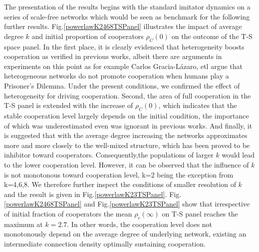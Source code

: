 \documentclass[preprint,12pt,3p]{elsarticle}
\begin{document}
    The presentation of the results begins with the standard imitator dynamics
on a series of scale-free networks which would be seen as benchmark for the following further results.
Fig.\ref{powerlawK2468TSPanel} illustrates the impact of average degree $k$
and initial proportion of cooperators $\rho_C(0)$ on the outcome of the T-S space panel.
    In the first place, it is clearly evidenced that heterogeneity boosts cooperation
as verified in previous works, albeit there are arguments in experiments on this point as for example Carlos Gracia-Lázaro, etl \cite{Gracia-LázaroFerrer-18206} argue that heterogeneous networks do not promote cooperation when humans play a Prisoner’s Dilemma.
Under the present conditions, we confirmed the effect of heterogeneity for driving cooperation.
    Second, the area of full cooperation in the T-S panel is extended with the
increase of $\rho_C(0)$, which indicates that the stable cooperation level largely depends on the initial condition, the importance of which was underestimated even was ignorant in previous works.
    And finally, it is suggested that with the average degree increasing the networks
approximates more and more closely to the well-mixed structure, which has been proved to be inhibitor toward cooperators.
Consequently,the populations of larger $k$ would lead to the lower cooperation level.
However, it can be observed that the influence of $k$ is not monotonous toward cooperation level,
k=2 being the exception from k=4,6,8.
We therefore further inspect the conditions of smaller resolution of $k$ and the result is given
in Fig.\ref{powerlawK23TSPanel}.
Fig.\ref{powerlawK2468TSPanel} and Fig.\ref{powerlawK23TSPanel}
show that irrespective of initial fraction of cooperators the mean $\rho_{c}(\infty)$ on T-S panel reaches the maximum at $k=2.7$.
In other words, the cooperation level does not monotonously depend on the average degree of underlying network, existing an intermediate connection density optimally sustaining cooperation.
\end{document}
